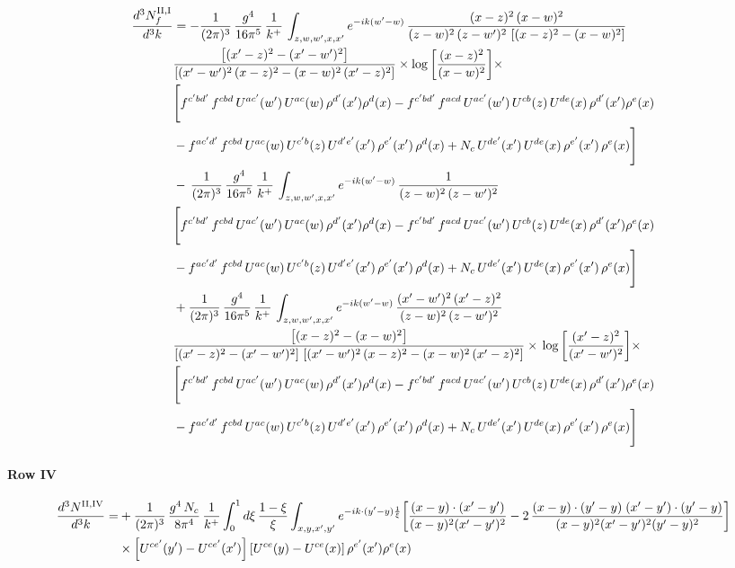 \documentclass[9pt]{article}
\numberwithin{equation}{section}
\begin{document}
\begin{align}
    \frac{d^{3}N^{\rm II,I}_{f}}{d^{3}k}  & =   - \frac{1}{(2\pi)^{3}}\, \frac{g^{4}}{16\pi^{5}}\,\frac{1}{k^{+}}\,\int_{z,w,w^{\prime},x,x'} e^{-ik(w^{\prime}-w)}\,\frac{(x-z)^{2}\, (x-w)^{2}}{(z-w)^{2}\, (z-w')^{2}\,\left[(x-z)^{2} - (x-w)^{2}\right]}\notag \\ & \frac{\left[(x'-z)^{2}-(x'-w')^{2}\right]}{\left[(x'-w')^{2}\, (x-z)^{2} - (x-w)^{2}\, (x'-z)^{2}\right]}\times \log{\left[\frac{(x-z)^{2}}{(x-w)^{2}}\right]}\times\notag \\ & \Bigg[f^{c'bd'}\,f^{cbd}\, U^{ac'}(w')\,U^{ac}(w)\,\rho^{d'}(x')\rho^{d}(x)- f^{c'bd'}\,f^{acd}\,U^{ac'}(w')\,U^{cb}(z)\,U^{de}(x)\,\rho^{d'}(x')\rho^{e}(x) \notag \\ & -f^{ac'd'}\,f^{cbd}\,U^{ac}(w)\,U^{c'b}(z)\,U^{d'e'}(x')\,\rho^{e'}(x')\,\rho^{d}(x) +N_{c}\,U^{de'}(x')\,U^{de}(x)\,\rho^{e'}(x')\,\rho^{e}(x)\Bigg]  \notag \\
& -\, \frac{1}{(2\pi)^{3}}\, \frac{g^{4}}{16\pi^{5}}\,\frac{1}{k^{+}}\,\int_{z,w,w^{\prime},x,x'} e^{-ik(w^{\prime}-w)}\,\frac{1}{(z-w)^{2}\, (z-w')^{2}}\notag \\ & \Bigg[f^{c'bd'}\,f^{cbd}\, U^{ac'}(w')\,U^{ac}(w)\,\rho^{d'}(x')\rho^{d}(x)- f^{c'bd'}\,f^{acd}\,U^{ac'}(w')\,U^{cb}(z)\,U^{de}(x)\,\rho^{d'}(x')\rho^{e}(x) \notag \\ & -f^{ac'd'}\,f^{cbd}\,U^{ac}(w)\,U^{c'b}(z)\,U^{d'e'}(x')\,\rho^{e'}(x')\,\rho^{d}(x) +N_{c}\,U^{de'}(x')\,U^{de}(x)\,\rho^{e'}(x')\,\rho^{e}(x)\Bigg]  \notag \\
& + \frac{1}{(2\pi)^{3}}\, \frac{g^{4}}{16\pi^{5}}\,\frac{1}{k^{+}}\,\int_{z,w,w^{\prime},x,x'} e^{-ik(w^{\prime}-w)}\,\frac{(x'-w')^{2}\, (x'-z)^{2}}{(z-w)^{2}\, (z-w')^{2}}\notag \\ & \frac{\left[(x-z)^{2} - (x-w)^{2}\right]}{\left[(x'-z)^{2} - (x'-w')^{2}\right]\, \left[(x'-w')^{2}\, (x - z)^{2} - (x-w)^{2}\,(x'-z)^{2}\right]}\times\, \log{\left[\frac{(x'-z)^{2}}{(x'-w')^{2}}\right]}\times \notag \\ &  \Bigg[f^{c'bd'}\,f^{cbd}\, U^{ac'}(w')\,U^{ac}(w)\,\rho^{d'}(x')\rho^{d}(x)- f^{c'bd'}\,f^{acd}\,U^{ac'}(w')\,U^{cb}(z)\,U^{de}(x)\,\rho^{d'}(x')\rho^{e}(x) \notag \\ & -f^{ac'd'}\,f^{cbd}\,U^{ac}(w)\,U^{c'b}(z)\,U^{d'e'}(x')\,\rho^{e'}(x')\,\rho^{d}(x) +N_{c}\,U^{de'}(x')\,U^{de}(x)\,\rho^{e'}(x')\,\rho^{e}(x)\Bigg]
\end{align}
\paragraph{Row IV}
\begin{align}
\frac{d^{3}N^{\rm II,IV}}{d^{3}k}= &  +\frac{1}{(2\pi)^{3}}\,\frac{g^{4}\,N_{c}}{8\pi^{4}}\,\frac{1}{k^{+}}\int_{0}^{1}d\xi\,\frac{1-\xi}{\xi}\int_{x,y,x',y'}e^{-ik\cdot(y'-y)\frac{1}{\xi}}\bigg[\frac{(x-y)\cdot(x'-y')}{(x-y)^{2}(x'-y')^{2}}-2\,\frac{(x-y)\cdot(y'-y)\;(x'-y')\cdot(y'-y)}{(x-y)^{2}(x'-y')^{2}(y'-y)^{2}}\bigg]\notag\\
&\times\left[U^{ce'}(y') - U^{ce'}(x')\right]\left[U^{ce}(y) - U^{ce}(x)\right]\rho^{e'}(x')\rho^{e}(x)
\end{align}
\end{document}
